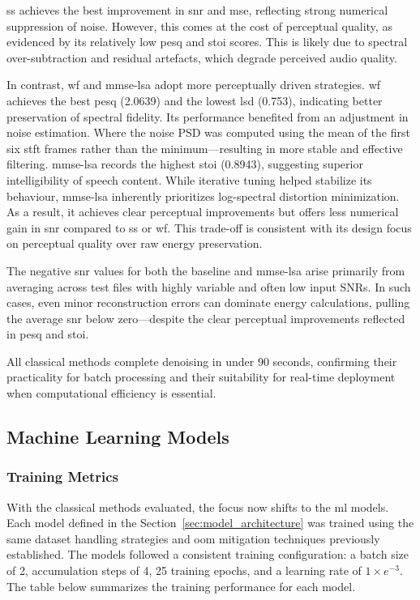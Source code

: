 \gls{ss} achieves the best improvement in \gls{snr} and \gls{mse}, reflecting strong numerical suppression of noise. However, this comes at the cost of perceptual quality, as evidenced by its relatively low \gls{pesq} and \gls{stoi} scores. This is likely due to spectral over-subtraction and residual artefacts, which degrade perceived audio quality.

In contrast, \gls{wf} and \gls{mmse-lsa} adopt more perceptually driven strategies. \gls{wf} achieves the best \gls{pesq} (2.0639) and the lowest \gls{lsd} (0.753), indicating better preservation of spectral fidelity. Its performance benefited from an adjustment in noise estimation. Where the noise PSD was computed using the mean of the first six \gls{stft} frames rather than the minimum—resulting in more stable and effective filtering. \gls{mmse-lsa} records the highest \gls{stoi} (0.8943), suggesting superior intelligibility of speech content. While iterative tuning helped stabilize its behaviour, \gls{mmse-lsa} inherently prioritizes log-spectral distortion minimization. As a result, it achieves clear perceptual improvements but offers less numerical gain in \gls{snr} compared to \gls{ss} or \gls{wf}. This trade-off is consistent with its design focus on perceptual quality over raw energy preservation.

The negative \gls{snr} values for both the baseline and \gls{mmse-lsa} arise primarily from averaging across test files with highly variable and often low input SNRs. In such cases, even minor reconstruction errors can dominate energy calculations, pulling the average \gls{snr} below zero—despite the clear perceptual improvements reflected in \gls{pesq} and \gls{stoi}.

All classical methods complete denoising in under 90 seconds, confirming their practicality for batch processing and their suitability for real-time deployment when computational efficiency is essential.

\subsection{Machine Learning Models}
\label{sec:ml_models}

\subsubsection{Training Metrics}
\label{sec:training_metrics}

With the classical methods evaluated, the focus now shifts to the \gls{ml} models. Each model defined in the Section~\ref{sec:model_architecture} was trained using the same dataset handling strategies and \gls{oom} mitigation techniques previously established. The models followed a consistent training configuration: a batch size of 2, accumulation steps of 4, 25 training epochs, and a learning rate of $1 \times e^{-3}$. The table below summarizes the training performance for each model.

